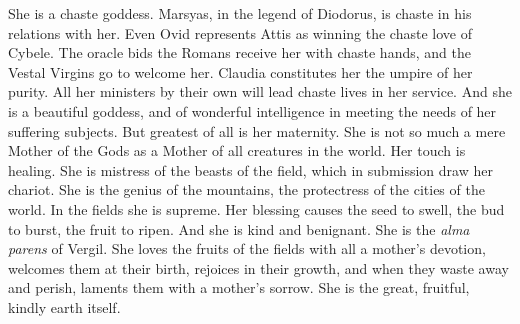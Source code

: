 \documentclass[a4paper, 11pt, oneside, polutonikogreek, english]{article}
\begin{document}
She is a chaste goddess. Marsyas, in the legend of Diodorus, is chaste in his relations with her. Even Ovid represents Attis as winning the chaste love of Cybele. The oracle bids the Romans receive her with chaste hands, and the Vestal Virgins go to welcome her. Claudia constitutes her the umpire of her purity. All her ministers by their own will lead chaste lives in her service. And she is a beautiful goddess, and of wonderful intelligence in meeting the needs of her suffering subjects. But greatest of all is her maternity. She is not so much a mere Mother of the Gods as a Mother of all creatures in the world. Her touch is healing. She is mistress of the beasts of the field, which in submission draw her chariot. She is the genius of the mountains, the protectress of the cities of the world. In the fields she is supreme. Her blessing causes the seed to swell, the bud to burst, the fruit to ripen. And she is kind and benignant. She is the \emph{alma parens} of Vergil. She loves the fruits of the fields with all a mother's devotion, welcomes them at their birth, rejoices in their growth, and when they waste away and perish, laments them with a mother's sorrow. She is the great, fruitful, kindly earth itself.
\end{document}
